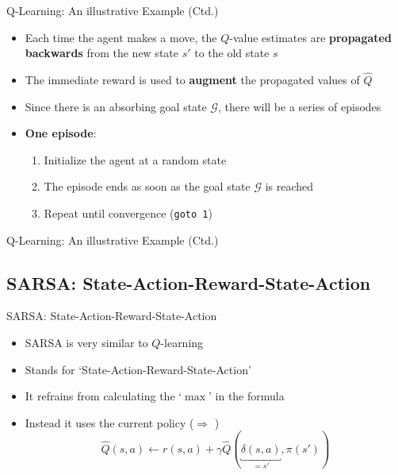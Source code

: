 \begin{frame}{Q-Learning: An illustrative Example (Ctd.)}{}
	\begin{itemize}
		\item Each time the agent makes a move, the $Q$-value estimates are \textbf{propagated backwards}
			from the new state $s'$ to the old state $s$
		\item The immediate reward is used to \textbf{augment} the propagated values of $\widehat{Q}$
		\item Since there is an absorbing goal state $\bm{\mathcal{G}}$, there will be a series of episodes
		\item \textbf{One episode}:
		\begin{enumerate}
			\item Initialize the agent at a random state
			\item The episode ends as soon as the goal state $\bm{\mathcal{G}}$ is reached
			\item Repeat until convergence (\texttt{goto 1})
		\end{enumerate}
	\end{itemize}
\end{frame}


\begin{frame}{Q-Learning: An illustrative Example (Ctd.)}{}
	
\end{frame}


\subsection{SARSA: State-Action-Reward-State-Action}

\begin{frame}{SARSA: State-Action-Reward-State-Action}{}
	\begin{itemize}
		\item SARSA is very similar to $Q$-learning
		\item Stands for `State-Action-Reward-State-Action'
		\item It refrains from calculating the `$\max$' in the formula
		\item Instead it uses the current policy ($\Rightarrow$ )
		\begin{equation}
			\widehat{Q}(s, a) \longleftarrow r(s, a) + \gamma \widehat{Q}(\underbracket{\delta(s, a)}_{=s'}, \pi(s'))
		\end{equation}
	\end{itemize}
\end{frame}


